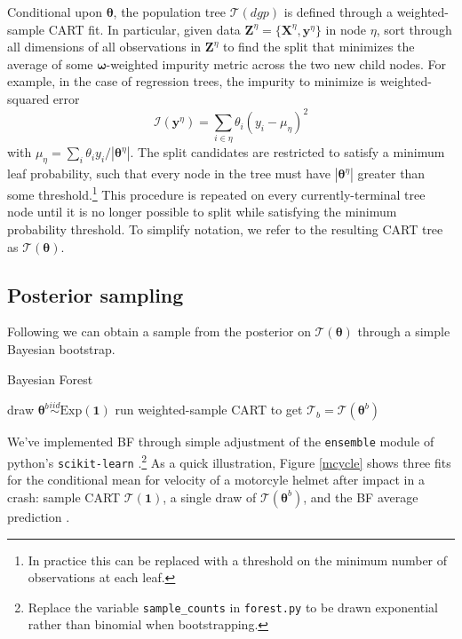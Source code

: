 \documentclass{article}
\begin{document}
Conditional upon $\boldsymbol{\theta}$, the population tree
$\mathcal{T}(dgp)$ is defined through a weighted-sample
CART fit. In particular, given data
$\mathbf{Z}^\eta = \{\mathbf{X}^\eta,\mathbf{y}^\eta\}$ in node $\eta$,
sort through all dimensions of all observations in $\mathbf{Z}^\eta$ to
find the split that minimizes the average of some $\boldsymbol{\omega}$-weighted
impurity metric across the two new child nodes. For example, in the case
of regression trees, the impurity to minimize is
weighted-squared error
\begin{equation}
\mathcal{I}(\mathbf{y}^\eta) = \sum_{i\in \eta} \theta_i (y_i - \mu_\eta )^2
\end{equation}
with $\mu_\eta = \sum_i \theta_i y_i/|\boldsymbol{\theta}^\eta|$. The split
candidates are restricted to satisfy a minimum leaf probability, such that
every node in the tree must have  $|\boldsymbol{\theta}^\eta|$ greater than
some threshold.\footnote{In practice this can be replaced with a threshold on
the minimum number of observations at each leaf.}   This  procedure is
repeated on every currently-terminal tree node until it is no longer possible
to split while satisfying the minimum probability threshold. To simplify
notation, we refer to the resulting CART tree as
$\mathcal{T}(\boldsymbol{\theta})$.




\subsection{Posterior sampling}\label{posterior-sampling}



Following \cite{rubin_bayesian_1981} we can obtain a sample from the
posterior on $\mathcal{T}(\boldsymbol{\theta})$ through a simple
Bayesian bootstrap. 
\begin{algorithm}[h]
   \caption{Bayesian Forest}
   \label{alg:bf}
\begin{algorithmic}
   \STATE draw $\boldsymbol{\theta}^b \stackrel{iid}{\sim} \mathrm{Exp}(\mathbf{1})$
   \STATE run weighted-sample CART to get $\mathcal{T}_b = \mathcal{T}(\boldsymbol{\theta}^b)$
   \ENDFOR
\end{algorithmic}
\end{algorithm}

   We've implemented  BF through simple adjustment of the
\texttt{ensemble} module of python's \texttt{scikit-learn} \citep{scikit-learn}.\footnote{Replace the variable \texttt{sample\_counts} in \texttt{forest.py}  to be
drawn exponential rather than binomial when bootstrapping.}  As a quick illustration, Figure \ref{mcycle} shows three fits for the conditional mean for velocity of a motorcyle helmet after  impact in a crash: sample CART $\mathcal{T}(\mathbf{1})$, a single draw of $\mathcal{T}(\boldsymbol{\theta}^b)$, and the BF average prediction \citep[data are from][]{mass}.
\end{document}
